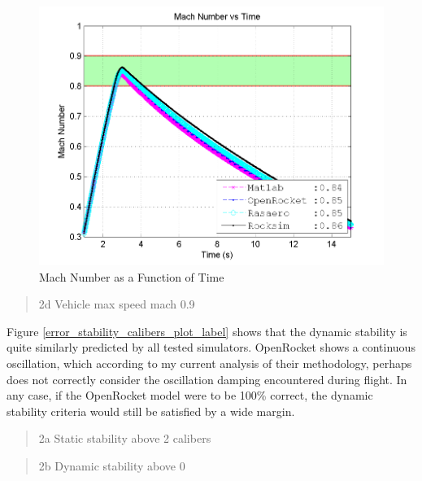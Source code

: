 \documentclass[]{book}
\begin{document}
\begin{figure}[htbp]
\centering
\includegraphics{images/plots/error_mach_plot.png}
\caption{Mach Number as a Function of Time
\label{error_mach_plot_label}}
\end{figure}

\begin{quote}
2d Vehicle max speed mach 0.9
\end{quote}

\clearpage

Figure \ref{error_stability_calibers_plot_label} shows that the dynamic
stability is quite similarly predicted by all tested simulators.
OpenRocket shows a continuous oscillation, which according to my current
analysis of their methodology, perhaps does not correctly consider the
oscillation damping encountered during flight. In any case, if the
OpenRocket model were to be 100\% correct, the dynamic stability
criteria would still be satisfied by a wide margin.

\begin{quote}
2a Static stability above 2 calibers
\end{quote}

\begin{quote}
2b Dynamic stability above 0
\end{quote}
\end{document}
